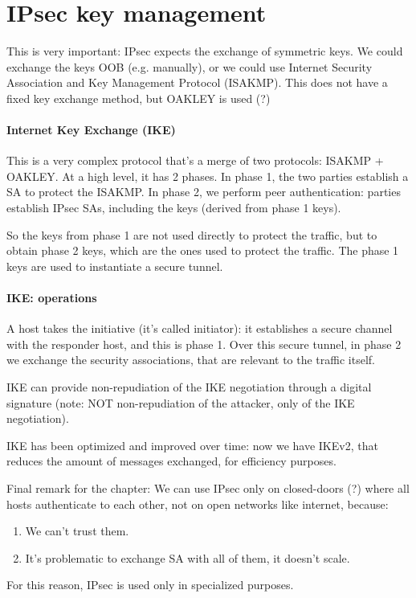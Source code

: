 \section{IPsec key management}
This is very important: IPsec expects the exchange of symmetric keys. We could exchange the keys OOB (e.g. manually), or we could use Internet Security Association and Key Management Protocol (ISAKMP). This does not have a fixed key exchange method, but OAKLEY is used (?)

\paragraph{Internet Key Exchange (IKE)}
This is a very complex protocol that's a merge of two protocols: ISAKMP + OAKLEY. At a high level, it has 2 phases. In phase 1, the two parties establish a SA to protect the ISAKMP. In phase 2, we perform peer authentication: parties establish IPsec SAs, including the keys (derived from phase 1 keys).

So the keys from phase 1 are not used directly to protect the traffic, but to obtain phase 2 keys, which are the ones used to protect the traffic. The phase 1 keys are used to instantiate a secure tunnel.

\paragraph{IKE: operations}
A host takes the initiative (it's called initiator): it establishes a secure channel with the responder host, and this is phase 1. Over this secure tunnel, in phase 2 we exchange the security associations, that are relevant to the traffic itself.

IKE can provide non-repudiation of the IKE negotiation through a digital signature (note: NOT non-repudiation of the attacker, only of the IKE negotiation).

IKE has been optimized and improved over time: now we have IKEv2, that reduces the amount of messages exchanged, for efficiency purposes.

Final remark for the chapter: We can use IPsec only on closed-doors (?) where all hosts authenticate to each other, not on open networks like internet, because:
\begin{enumerate}
    \item We can't trust them.
    \item It's problematic to exchange SA with all of them, it doesn't scale.
\end{enumerate}
For this reason, IPsec is used only in specialized purposes.
